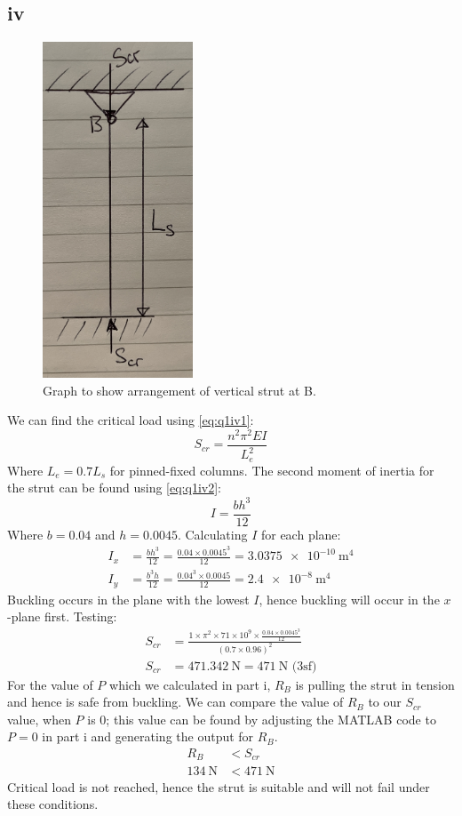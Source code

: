\documentclass[11pt]{article}
\numberwithin{equation}{section}
\begin{document}
\subsection{iv}
\begin{figure}[H]
    \centering
    \includegraphics[height = 10cm]{./img/q1iv1.jpg}
    \caption{Graph to show arrangement of vertical strut at B.}
    \label{fig:q1iv}
\end{figure}
We can find the critical load using \ref{eq:q1iv1}:
\begin{equation}
    S_{cr} = \frac{n^2 \pi^2 EI}{L_e^2} \label{eq:q1iv1}
\end{equation}
Where $L_e = 0.7L_s$ for pinned-fixed columns. The second moment of inertia for the strut can be found using \ref{eq:q1iv2}:
\begin{equation}
    I = \frac{bh^3}{12} \label{eq:q1iv2}
\end{equation}
Where $b = 0.04$ and $h = 0.0045$. Calculating $I$ for each plane:
\begin{align}
    I_x &= \frac{bh^3}{12} = \frac{0.04\times 0.0045^3}{12} = \SI{3.0375e-10}{\meter\tothe{4}}\\
    I_y &= \frac{b^3h}{12} = \frac{0.04^3\times 0.0045}{12} = \SI{2.4e-8}{\meter\tothe{4}}
\end{align}
Buckling occurs in the plane with the lowest $I$, hence buckling will occur in the $x$-plane first. Testing:
\begin{align}
    S_{cr} &= \frac{1\times \pi^2 \times 71\times 10^{9}\times \frac{0.04\times 0.0045^3}{12}}{(0.7\times0.96)^2}\\
    S_{cr} &= \SI{471.342}{\newton} = \SI{471}{\newton} \textrm{ (3sf)}
\end{align}
For the value of $P$ which we calculated in part i, $R_B$ is pulling the strut in tension and hence is safe from buckling. We can compare the value of $R_B$ to our $S_{cr}$ value, when $P$ is 0; this value can be found by adjusting the MATLAB code to $P=0$ in part i and generating the output for $R_B$.
\begin{align}
    R_B &< S_{cr}\\
    \SI{134}{\newton} &< \SI{471}{\newton}
\end{align}
Critical load is not reached, hence the strut is suitable and will not fail under these conditions. 
\end{document}
